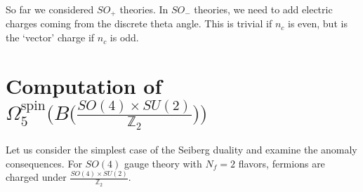 \documentclass[12pt]{article}
\numberwithin{equation}{section}
\def\bZ{\mathbb{Z}}
\begin{document}
So far we considered $SO_+$ theories. 
In $SO_-$ theories, we need to add electric charges coming from the discrete theta angle.
This is trivial if $n_c$ is even, but is the `vector' charge if $n_c$ is odd.


\newpage

\appendix

\section{Computation of $\Omega_5^{\mathrm{spin}}\big(
	B\big(
		\tfrac{SO(4)\times SU(2)}{\bZ_2}
	\big)
\big)$}

Let us consider the simplest case of the Seiberg duality and examine the anomaly consequences.
For $SO(4)$ gauge theory with $N_f=2$ flavors, fermions are charged under $\tfrac{SO(4)\times SU(2)}{\bZ_2}$.
\end{document}
